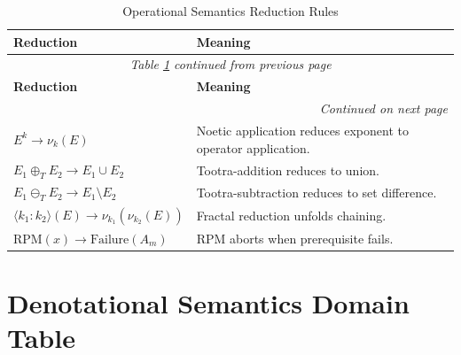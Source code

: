 \renewcommand{\arraystretch}{1.25}
\small
\begin{longtable}{p{3.5cm}|p{8cm}}
\caption{Operational Semantics Reduction Rules}
\label{tab:operational-semantics} \\
\toprule
\textbf{Reduction}
& \textbf{Meaning}
\\
\midrule
\endfirsthead
\multicolumn{2}{c}{\textit{Table \ref{tab:operational-semantics} continued from previous page}} \\
\toprule
\textbf{Reduction}
& \textbf{Meaning}
\\
\midrule
\endhead
\midrule
\multicolumn{2}{r}{\textit{Continued on next page}} \\
\endfoot
\bottomrule
\endlastfoot

$E^{k} \to \nu_k(E)$ &
Noetic application reduces exponent to operator application. \\

$E_1 \oplus_T E_2 \to E_1 \cup E_2$ &
Tootra-addition reduces to union. \\

$E_1 \ominus_T E_2 \to E_1 \setminus E_2$ &
Tootra-subtraction reduces to set difference. \\

$\langle k_1:k_2 \rangle(E) \to \nu_{k_1}(\nu_{k_2}(E))$ &
Fractal reduction unfolds chaining. \\

$\text{RPM}(x) \to \text{Failure}(A_m)$ &
RPM aborts when prerequisite fails. \\

\end{longtable}
\normalsize

\section{Denotational Semantics Domain Table}

